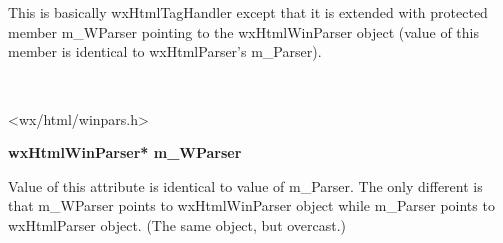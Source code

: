 %
%

\section{}\label{wxhtmlwintaghandler}

This is basically wxHtmlTagHandler except that
it is extended with protected member m\_WParser pointing to
the wxHtmlWinParser object (value of this member is identical
to wxHtmlParser's m\_Parser).


\\


<wx/html/winpars.h>





\label{wxhtmlwintaghandlerwxhtmlwintaghandlermwparser}

{\bf wxHtmlWinParser* m\_WParser}

Value of this attribute is identical to value of m\_Parser. The only different
is that m\_WParser points to wxHtmlWinParser object while m\_Parser
points to wxHtmlParser object. (The same object, but overcast.)

